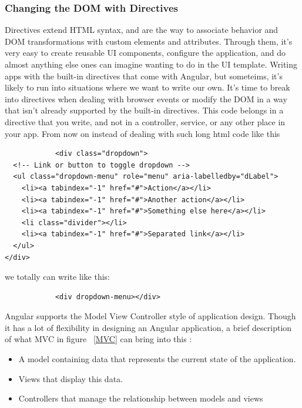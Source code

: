 \documentclass[14pt,a4paper]{extreport}
\begin{document}
			\subsubsection{Changing the DOM with Directives}
			Directives extend HTML syntax, and are the way to associate behavior and DOM transformations with custom elements and attributes. Through them, it's very easy to create reusable UI components, configure the application, and do almost anything else ones can imagine wanting to do in the UI template. Writing apps with the built-in directives that come with Angular, but someteims, it's likely to run into situations where we want to write our own. It’s time to break into directives when dealing with browser events or modify the DOM in a way that isn’t already supported by the built-in directives. This code belongs in a directive that you write, and not in a controller, service, or any other place in your app.
			From now on instead of dealing with such long html code like this 
			\begin{verbatim}
			<div class="dropdown">
  <!-- Link or button to toggle dropdown -->
  <ul class="dropdown-menu" role="menu" aria-labelledby="dLabel">
    <li><a tabindex="-1" href="#">Action</a></li>
    <li><a tabindex="-1" href="#">Another action</a></li>
    <li><a tabindex="-1" href="#">Something else here</a></li>
    <li class="divider"></li>
    <li><a tabindex="-1" href="#">Separated link</a></li>
  </ul>
</div>
			\end{verbatim}
			we totally can write like this: 
			\begin{verbatim}
			<div dropdown-menu></div>
			\end{verbatim}
				Angular supports the Model View Controller style of application design. Though it has a lot of flexibility in designing an Angular application, a brief description of what MVC in figure ~\ref{MVC} can bring into this :
				\begin{itemize}
\item A model containing data that represents the current state of the application.
\item Views that display this data.
\item Controllers that manage the relationship between models and views
  				\end{itemize}
\end{document}
